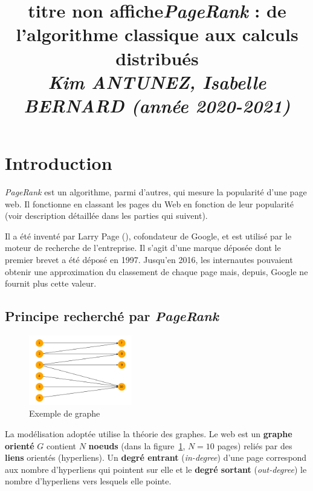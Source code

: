 \documentclass[10pt,a4paper]{article}
\title{titre non affiche}
\author{}
\date{}
\title{\textbf{\emph{PageRank} : de l'algorithme classique aux calculs distribués} \medskip \\ \large \emph{Kim ANTUNEZ, Isabelle BERNARD (année 2020-2021)}}
\author{}
\theoremstyle{break}
\begin{document}
\maketitle


\vspace{-15truemm}

\hypertarget{introduction}{%
\section{Introduction}\label{introduction}}

\emph{PageRank} est un algorithme, parmi d'autres, qui mesure la popularité d'une page web. Il fonctionne en classant les pages du Web en fonction de leur popularité (voir description détaillée dans les parties qui suivent).

Il a été inventé par Larry Page (\cite{Brin}), cofondateur de Google, et est utilisé par le moteur de recherche de l'entreprise. Il s'agit d'une marque déposée dont le premier brevet a été déposé en 1997. Jusqu'en 2016, les internautes pouvaient obtenir une approximation du classement de chaque page mais, depuis, Google ne fournit plus cette valeur.

\hypertarget{principe-recherchuxe9-par-pagerank}{%
\subsection{\texorpdfstring{Principe recherché par \emph{PageRank}}{Principe recherché par PageRank}}\label{principe-recherchuxe9-par-pagerank}}

\begin{figure}[htp]
\begin{center}
\includegraphics[width=0.4\textwidth]{img/DocPageRank_files/DocPageRank_2_0.png}
\end{center}
\captionsetup{margin=0cm,format=hang,justification=justified}
\caption{Exemple de graphe}\label{fig:fig0}
\end{figure}

La modélisation adoptée utilise la théorie des graphes. Le web est un \textbf{graphe orienté} \(G\) contient \(N\) \textbf{noeuds} (dans la figure~\ref{fig:fig0}, \(N = 10\) pages) reliés par des \textbf{liens} orientés (hyperliens). Un \textbf{degré entrant} (\emph{in-degree}) d'une page correspond aux nombre d'hyperliens qui pointent sur elle et le \textbf{degré sortant} (\emph{out-degree}) le nombre d'hyperliens vers lesquels elle pointe.
\end{document}
